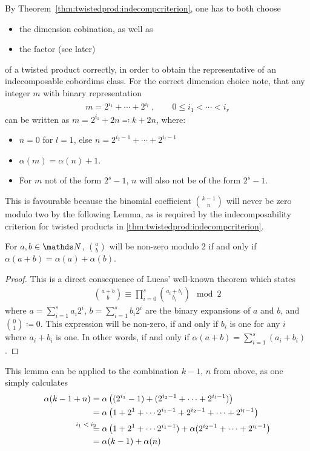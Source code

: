 By Theorem~\autoref{thm:twistedprod:indecompcriterion}, one has to
both choose
\begin{itemize}
\item the dimension cobination, as well as
\item the factor (see later)
\end{itemize}
of a twisted product correctly, in order to obtain the representative
of an indecomposable cobordims class.
For the correct dimension choice note, that any integer $m$ with
binary representation
\begin{gather*}
  m=2^{i_1}+\dotsb+2^{i_l}
  \;,\qquad
  0 \leq i_1<\dotsb<i_r
\end{gather*}
can be written as $m=2^{i_1}+2n\eqqcolon k+2n$, where:
\begin{itemize}
\item $n=0$ for $l=1$, else $n=2^{i_2-1}+\dotsb+2^{i_l-1}$
\item $\alpha(m)=\alpha(n)+1$.
\item For $m$ not of the form $2^s-1$, $n$ will also not be of the
  form $2^s-1$.
\end{itemize}
This is favourable because the binomial coefficient
$\binom{k-1}{n}$ will never be zero modulo two by the following Lemma,
as is required by the indecomposability criterion for twisted products
in \autoref{thm:twistedprod:indecompcriterion}.
\begin{Lem}
  For $a,b\in\Nat$, $\binom{a}{b}$ will be non-zero modulo 2 if and only
  if $\alpha(a+b)=\alpha(a)+\alpha(b)$.
  \begin{proof}
    This is a direct consequence of Lucas' well-known theorem
    which states
    \begin{gather*}
      \binom{a+b}{b} \equiv \prod_{i=0}^s \binom{a_i+b_i}{b_i} \mod 2
    \end{gather*}
    where $a=\sum_{i=1}^s a_i2^{i}$, $b=\sum_{i=1}^s b_i2^{i}$ are the
    binary expansions of $a$ and $b$, and $\binom{0}{1}\coloneqq 0$.
    This expression will be non-zero, if and only if $b_i$ is one for
    any $i$ where $a_i+b_i$ is one. In other words, if and only if
    $\alpha(a+b)=\sum_{i=1}^s(a_i+b_i)$.    
  \end{proof}
\end{Lem}
This lemma can be applied to the combination $k-1$, $n$ from above, as one
simply calculates
\begin{align*}
  \alpha(k-1+n)
  &= \alpha\left((2^{i_1}-1)+ (2^{i_2-1}+\dotsb+2^{i_l-1})\right) \\
  &= \alpha\left(1+2^1+\dotsb 2^{i_1-1} + 2^{i_2-1}+\dotsb+2^{i_l-1}\right) \\
  &\equalsby{$i_1<i_2$}
  \alpha\left(1+2^1+\dotsb 2^{i_1-1}) + \alpha(2^{i_2-1}+\dotsb+2^{i_l-1}\right)\\
  &= \alpha(k-1) + \alpha(n)
\end{align*}

